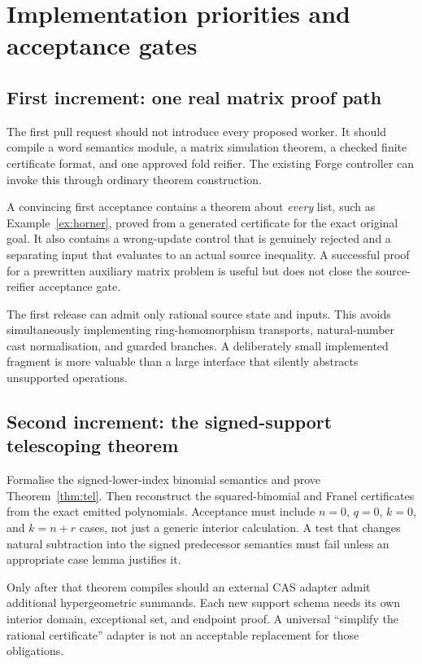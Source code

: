 \section{Implementation priorities and acceptance gates}
\label{sec:priorities}

\subsection{First increment: one real matrix proof path}

The first pull request should not introduce every proposed worker. It should
compile a word semantics module, a matrix simulation theorem, a checked finite
certificate format, and one approved fold reifier. The existing Forge
controller can invoke this through ordinary theorem construction.

A convincing first acceptance contains a theorem about \emph{every} list, such
as Example~\ref{ex:horner}, proved from a generated certificate for the exact
original goal. It also contains a wrong-update control that is genuinely
rejected and a separating input that evaluates to an actual source inequality.
A successful proof for a prewritten auxiliary matrix problem is useful but does
not close the source-reifier acceptance gate.

The first release can admit only rational source state and inputs. This avoids
simultaneously implementing ring-homomorphism transports, natural-number cast
normalisation, and guarded branches. A deliberately small implemented fragment
is more valuable than a large interface that silently abstracts unsupported
operations.

\subsection{Second increment: the signed-support telescoping theorem}

Formalise the signed-lower-index binomial semantics and prove
Theorem~\ref{thm:tel}. Then reconstruct the squared-binomial and Franel
certificates from the exact emitted polynomials. Acceptance must include
$n=0$, $q=0$, $k=0$, and $k=n+r$ cases, not just a generic interior calculation.
A test that changes natural subtraction into the signed predecessor semantics
must fail unless an appropriate case lemma justifies it.

Only after that theorem compiles should an external CAS adapter admit additional
hypergeometric summands. Each new support schema needs its own interior domain,
exceptional set, and endpoint proof. A universal ``simplify the rational
certificate'' adapter is not an acceptable replacement for those obligations.


